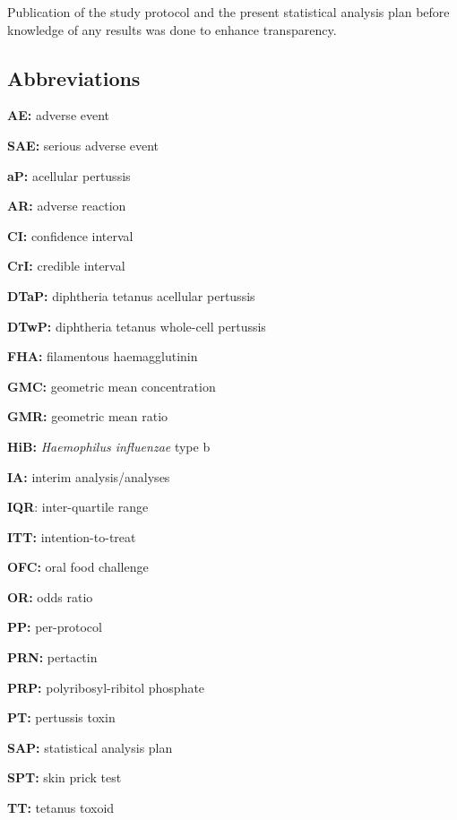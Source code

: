 \documentclass{bmcart}
\begin{document}
Publication of the study protocol and the present statistical analysis plan before knowledge of any results was done to enhance transparency.


\begin{backmatter}

\section*{Abbreviations}

\textbf{AE:} adverse event

\textbf{SAE:} serious adverse event

\textbf{aP:} acellular pertussis

\textbf{AR:} adverse reaction

\textbf{CI:} confidence interval

\textbf{CrI:} credible interval

\textbf{DTaP:} diphtheria tetanus acellular pertussis 

\textbf{DTwP:} diphtheria tetanus whole-cell pertussis 

\textbf{FHA:} filamentous haemagglutinin

\textbf{GMC:} geometric mean concentration

\textbf{GMR:} geometric mean ratio

\textbf{HiB:} \textit{Haemophilus influenzae} type b 

\textbf{IA:} interim analysis/analyses

\textbf{IQR}: inter-quartile range

\textbf{ITT:} intention-to-treat

\textbf{OFC:} oral food challenge

\textbf{OR:} odds ratio

\textbf{PP:} per-protocol

\textbf{PRN:} pertactin

\textbf{PRP:} polyribosyl-ribitol phosphate

\textbf{PT:} pertussis toxin

\textbf{SAP:} statistical analysis plan

\textbf{SPT:} skin prick test

\textbf{TT:} tetanus toxoid


\end{backmatter}
\end{document}

